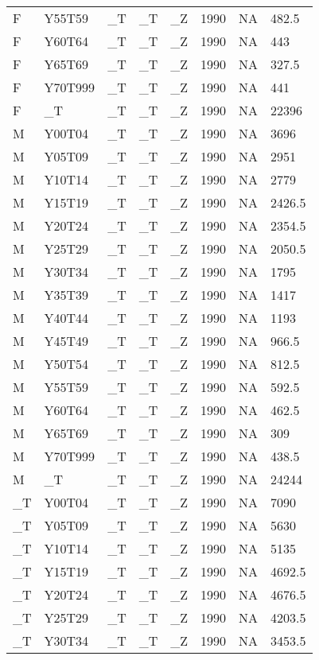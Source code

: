 \begin{longtable}[t]{llllllll}
F & Y55T59 & \_T & \_T & \_Z & 1990 & NA & 482.5\\
\addlinespace
F & Y60T64 & \_T & \_T & \_Z & 1990 & NA & 443\\
F & Y65T69 & \_T & \_T & \_Z & 1990 & NA & 327.5\\
F & Y70T999 & \_T & \_T & \_Z & 1990 & NA & 441\\
F & \_T & \_T & \_T & \_Z & 1990 & NA & 22396\\
M & Y00T04 & \_T & \_T & \_Z & 1990 & NA & 3696\\
\addlinespace
M & Y05T09 & \_T & \_T & \_Z & 1990 & NA & 2951\\
M & Y10T14 & \_T & \_T & \_Z & 1990 & NA & 2779\\
M & Y15T19 & \_T & \_T & \_Z & 1990 & NA & 2426.5\\
M & Y20T24 & \_T & \_T & \_Z & 1990 & NA & 2354.5\\
M & Y25T29 & \_T & \_T & \_Z & 1990 & NA & 2050.5\\
\addlinespace
M & Y30T34 & \_T & \_T & \_Z & 1990 & NA & 1795\\
M & Y35T39 & \_T & \_T & \_Z & 1990 & NA & 1417\\
M & Y40T44 & \_T & \_T & \_Z & 1990 & NA & 1193\\
M & Y45T49 & \_T & \_T & \_Z & 1990 & NA & 966.5\\
M & Y50T54 & \_T & \_T & \_Z & 1990 & NA & 812.5\\
\addlinespace
M & Y55T59 & \_T & \_T & \_Z & 1990 & NA & 592.5\\
M & Y60T64 & \_T & \_T & \_Z & 1990 & NA & 462.5\\
M & Y65T69 & \_T & \_T & \_Z & 1990 & NA & 309\\
M & Y70T999 & \_T & \_T & \_Z & 1990 & NA & 438.5\\
M & \_T & \_T & \_T & \_Z & 1990 & NA & 24244\\
\addlinespace
\_T & Y00T04 & \_T & \_T & \_Z & 1990 & NA & 7090\\
\_T & Y05T09 & \_T & \_T & \_Z & 1990 & NA & 5630\\
\_T & Y10T14 & \_T & \_T & \_Z & 1990 & NA & 5135\\
\_T & Y15T19 & \_T & \_T & \_Z & 1990 & NA & 4692.5\\
\_T & Y20T24 & \_T & \_T & \_Z & 1990 & NA & 4676.5\\
\addlinespace
\_T & Y25T29 & \_T & \_T & \_Z & 1990 & NA & 4203.5\\
\_T & Y30T34 & \_T & \_T & \_Z & 1990 & NA & 3453.5\\

\end{longtable}
